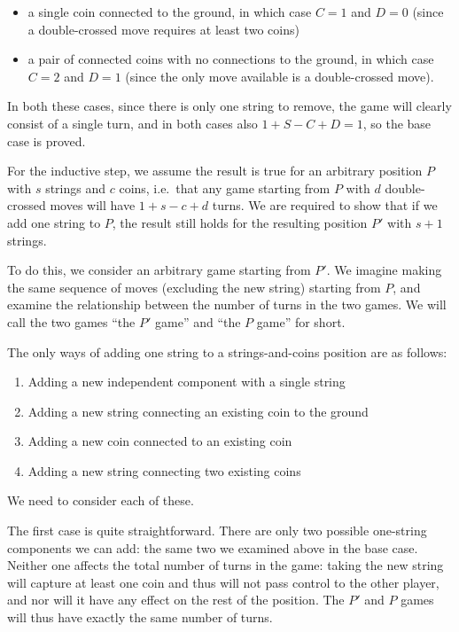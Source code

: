 \documentclass[a4paper,twocolumn]{article}
\begin{document}
\begin{itemize}
  \item a single coin connected to the ground, in which case $C=1$ and
    $D=0$ (since a double-crossed move requires at least two coins)
  \item a pair of connected coins with no connections to the ground,
    in which case $C=2$ and $D=1$ (since the only move available is
    a double-crossed move).
\end{itemize}

In both these cases, since there is only one string to remove, the
game will clearly consist of a single turn, and in both cases also
$1+S-C+D = 1$, so the base case is proved.

For the inductive step, we assume the result is true for an
arbitrary position $P$ with $s$ strings and $c$ coins, i.e.\ that any
game starting from $P$ with $d$ double-crossed moves will have
$1+s-c+d$ turns. We are required to show that if we add one string
to $P$, the result still holds for the resulting position $P'$ with
$s+1$ strings.

To do this, we consider an arbitrary game starting from $P'$. We
imagine making the same sequence of moves (excluding the new string)
starting from $P$, and examine the relationship between the number
of turns in the two games. We will call the two games ``the $P'$
game'' and ``the $P$ game'' for short.

The only ways of adding one string to a strings-and-coins position
are as follows:

\begin{enumerate}
  \item Adding a new independent component with a single string
  \item Adding a new string connecting an existing coin to the
    ground
  \item Adding a new coin connected to an existing coin
  \item Adding a new string connecting two existing coins
\end{enumerate}

We need to consider each of these.

The first case is quite straightforward. There are only two possible
one-string components we can add: the same two we examined above in
the base case. Neither one affects the total number of turns in the
game: taking the new string will capture at least one coin and thus
will not pass control to the other player, and nor will it have any
effect on the rest of the position. The $P'$ and $P$ games will thus
have exactly the same number of turns.
\end{document}
